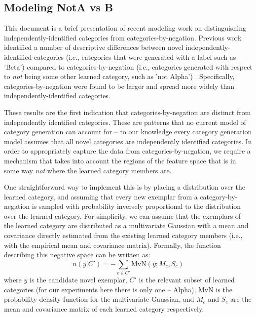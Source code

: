 \documentclass[12pt]{article}
\begin{document}
\doublespacing
\begin{flushleft}
\setlength\parindent{0.5in}

\section{Modeling NotA vs B}

This document is a brief presentation of recent modeling work on distinguishing independently-identified categories from
categories-by-negation. Previous work identified a number of descriptive differences between novel
independently-identified categories (i.e., categories that were generated with a label such as 'Beta') compared to
categories-by-negation (i.e., categories generated with respect to \emph{not} being some other learned category, such as
'not Alpha') \citep{liew2019nota}. Specifically, categories-by-negation were found to be larger and spread more widely
than independently-identified categories.

These results are the first indication that categories-by-negation are distinct from independently identified
categories. These are patterns that no current model of category generation can account for -- to our knowledge every
category generation model assumes that all novel categories are independently identified categories. In order to
appropriately capture the data from categories-by-negation, we require a mechanism that takes into account the regions
of the feature space that is in some way \emph{not} where the learned category members are.

One straightforward way to implement this is by placing a distribution over the learned category, and assuming that
every new exemplar from a category-by-negation is sampled with probability inversely proportional to the distribution
over the learned category. For simplicity, we can assume that the exemplars of the learned category are distributed as a
multivariate Gaussian with a mean and covariance directly estimated from the existing learned category members (i.e.,
with the empirical mean and covariance matrix). Formally, the function describing this negative space can be written as:
\begin{equation}\label{eq:negmech}
n(y|C') = -\sum_{c \in C'} \textrm{MvN}(y; M_c,S_c)
\end{equation}
where $y$ is the candidate novel exemplar, $C'$ is the relevant subset of learned categories (for our experiments here
there is only one -- Alpha), MvN is the probability density function for the multivariate Gaussian, and $M_c$ and $S_c$
are the mean and covariance matrix of each learned category respectively.


\end{flushleft}
\end{document}
